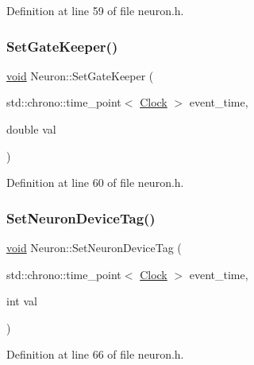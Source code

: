 Definition at line 59 of file neuron.\+h.

\mbox{\label{class_neuron_a492f597021faf1b74942bc75364c3c22}} 
\subsubsection{\texorpdfstring{Set\+Gate\+Keeper()}{SetGateKeeper()}}
{\footnotesize\ttfamily \mbox{\hyperlink{glad_8h_a950fc91edb4504f62f1c577bf4727c29}{void}} Neuron\+::\+Set\+Gate\+Keeper (\begin{DoxyParamCaption}\item[{std\+::chrono\+::time\+\_\+point$<$ \mbox{\hyperlink{universe_8h_a0ef8d951d1ca5ab3cfaf7ab4c7a6fd80}{Clock}} $>$}]{event\+\_\+time,  }\item[{double}]{val }\end{DoxyParamCaption})\hspace{0.3cm}{\ttfamily [inline]}}



Definition at line 60 of file neuron.\+h.

\mbox{\label{class_neuron_aa06d0f1a129e4a901a60e7343bc43533}} 
\subsubsection{\texorpdfstring{Set\+Neuron\+Device\+Tag()}{SetNeuronDeviceTag()}}
{\footnotesize\ttfamily \mbox{\hyperlink{glad_8h_a950fc91edb4504f62f1c577bf4727c29}{void}} Neuron\+::\+Set\+Neuron\+Device\+Tag (\begin{DoxyParamCaption}\item[{std\+::chrono\+::time\+\_\+point$<$ \mbox{\hyperlink{universe_8h_a0ef8d951d1ca5ab3cfaf7ab4c7a6fd80}{Clock}} $>$}]{event\+\_\+time,  }\item[{int}]{val }\end{DoxyParamCaption})\hspace{0.3cm}{\ttfamily [inline]}}



Definition at line 66 of file neuron.\+h.

\mbox{\label{class_neuron_afc685a0444425fceab6685a6ee004b65}} 
